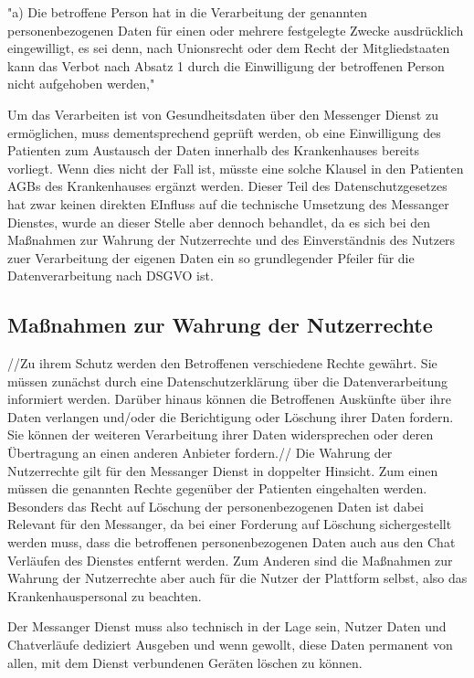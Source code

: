 "a) Die betroffene Person hat in die Verarbeitung der genannten personenbezogenen Daten für einen oder mehrere festgelegte Zwecke ausdrücklich eingewilligt, es sei denn, nach Unionsrecht oder dem Recht der Mitgliedstaaten kann das Verbot nach Absatz 1 durch die Einwilligung der betroffenen Person nicht aufgehoben werden,"

Um das Verarbeiten ist von Gesundheitsdaten über den Messenger Dienst zu ermöglichen, muss dementsprechend geprüft werden, ob eine Einwilligung des Patienten zum Austausch der Daten innerhalb des Krankenhauses bereits vorliegt. Wenn dies nicht der Fall ist, müsste eine solche Klausel in den Patienten AGBs des Krankenhauses ergänzt werden. Dieser Teil des Datenschutzgesetzes hat zwar keinen direkten EInfluss auf die technische Umsetzung des Messanger Dienstes, wurde an dieser Stelle aber dennoch behandlet, da es sich bei den Maßnahmen zur Wahrung der Nutzerrechte und des Einverständnis des Nutzers zuer Verarbeitung der eigenen Daten ein so grundlegender Pfeiler für die Datenverarbeitung nach DSGVO ist.

\subsection{Maßnahmen zur Wahrung der Nutzerrechte}\label{subsection:mzwdn}
//Zu ihrem Schutz werden den Betroffenen verschiedene Rechte gewährt. Sie müssen zunächst durch eine Datenschutzerklärung über die Datenverarbeitung informiert werden. Darüber hinaus können die Betroffenen Auskünfte über ihre Daten verlangen und/oder die Berichtigung oder Löschung ihrer Daten fordern. Sie können der weiteren Verarbeitung ihrer Daten widersprechen oder deren Übertragung an einen anderen Anbieter fordern.//
Die Wahrung der Nutzerrechte gilt für den Messanger Dienst in doppelter Hinsicht. 
Zum einen müssen die genannten Rechte gegenüber der Patienten eingehalten werden. Besonders das Recht auf Löschung der personenbezogenen Daten ist dabei Relevant für den Messanger, da bei einer Forderung auf Löschung sichergestellt werden muss, dass die betroffenen personenbezogenen Daten auch aus den Chat Verläufen des Dienstes entfernt werden. Zum Anderen sind die Maßnahmen zur Wahrung der Nutzerrechte aber auch für die Nutzer der Plattform selbst, also das Krankenhauspersonal zu beachten.

Der Messanger Dienst muss also technisch in der Lage sein, Nutzer Daten und Chatverläufe dediziert Ausgeben und wenn gewollt, diese Daten permanent von allen, mit dem Dienst verbundenen Geräten löschen zu können. 


